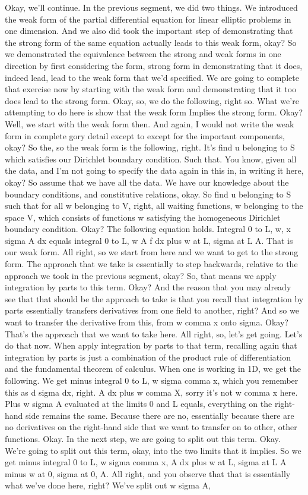 \documentclass[10pt]{article}
\begin{document}
Okay, we'll continue. In the previous segment, we did two things. We introduced the weak form of the partial differential equation for linear elliptic problems in one dimension. And we also did took the important step of demonstrating that the strong form of the same equation actually leads to this weak form, okay? So we demonstrated the equivalence between the strong and weak forms in one direction by first considering the form, strong form in demonstrating that it does, indeed lead, lead to the weak form that we'd specified. We are going to complete that exercise now by starting with the weak form and demonstrating that it too does lead to the strong form. Okay, so, we do the following, right so. What we're attempting to do here is show that the weak form Implies the strong form. Okay? Well, we start with the weak form then. And again, I would not write the weak form in complete gory detail except to except for the important components, okay? So the, so the weak form is the following, right. It's find u belonging to S which satisfies our Dirichlet boundary condition. Such that. You know, given all the data, and I'm not going to specify the data again in this in, in writing it here, okay? So assume that we have all the data. We have our knowledge about the boundary conditions, and constitutive relations, okay. So find u belonging to S such that for all w belonging to V, right, all waiting functions, w belonging to the space V, which consists of functions w satisfying the homogeneous Dirichlet boundary condition. Okay? The following equation holds. Integral 0 to L, w, x sigma A dx equals integral 0 to L, w A f dx plus w at L, sigma at L A. That is our weak form. All right, so we start from here and we want to get to the strong form. The approach that we take is essentially to step backwards, relative to the approach we took in the previous segment, okay? So, that means we apply integration by parts to this term. Okay? And the reason that you may already see that that should be the approach to take is that you recall that integration by parts essentially transfers derivatives from one field to another, right? And so we want to transfer the derivative from this, from w comma x onto sigma. Okay? That's the approach that we want to take here. All right, so, let's get going. Let's do that now. When apply integration by parts to that term, recalling again that integration by parts is just a combination of the product rule of differentiation and the fundamental theorem of calculus. When one is working in 1D, we get the following. We get minus integral 0 to L, w sigma comma x, which you remember this as d sigma dx, right. A dx plus w comma X, sorry it's not w comma x here. Plus w sigma A evaluated at the limits 0 and L equals, everything on the right-hand side remains the same. Because there are no, essentially because there are no derivatives on the right-hand side that we want to transfer on to other, other functions. Okay. In the next step, we are going to split out this term. Okay. We're going to split out this term, okay, into the two limits that it implies. So we get minus integral 0 to L, w sigma comma x, A dx plus w at L, sigma at L A minus w at 0, sigma at 0, A. All right, and you observe that that is essentially what we've done here, right? We've split out w sigma A, 
\end{document}
